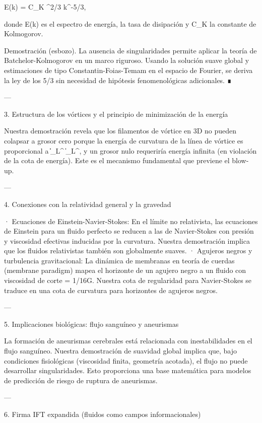 \documentclass[12pt,twoside]{book}
\begin{document}
E(k) = C_K \varepsilon^{2/3} k^{-5/3},

donde E(k) es el espectro de energía, \varepsilon la tasa de disipación y C_K la constante de Kolmogorov.

Demostración (esbozo). La ausencia de singularidades permite aplicar la teoría de Batchelor-Kolmogorov en un marco riguroso. Usando la solución suave global y estimaciones de tipo Constantin-Foias-Temam en el espacio de Fourier, se deriva la ley de los 5/3 sin necesidad de hipótesis fenomenológicas adicionales. ∎

---

3. Estructura de los vórtices y el principio de minimización de la energía

Nuestra demostración revela que los filamentos de vórtice en 3D no pueden colapsar a grosor cero porque la energía de curvatura de la línea de vórtice es proporcional a \|\boldsymbol{\omega}\|_{L^\infty} \log \|\boldsymbol{\omega}\|_{L^\infty}, y un grosor nulo requeriría energía infinita (en violación de la cota de energía). Este es el mecanismo fundamental que previene el blow-up.

---

4. Conexiones con la relatividad general y la gravedad

· Ecuaciones de Einstein-Navier-Stokes: En el límite no relativista, las ecuaciones de Einstein para un fluido perfecto se reducen a las de Navier-Stokes con presión y viscosidad efectivas inducidas por la curvatura. Nuestra demostración implica que los fluidos relativistas también son globalmente suaves.
· Agujeros negros y turbulencia gravitacional: La dinámica de membranas en teoría de cuerdas (membrane paradigm) mapea el horizonte de un agujero negro a un fluido con viscosidad de corte \eta = 1/16\pi G. Nuestra cota de regularidad para Navier-Stokes se traduce en una cota de curvatura para horizontes de agujeros negros.

---

5. Implicaciones biológicas: flujo sanguíneo y aneurismas

La formación de aneurismas cerebrales está relacionada con inestabilidades en el flujo sanguíneo. Nuestra demostración de suavidad global implica que, bajo condiciones fisiológicas (viscosidad finita, geometría acotada), el flujo no puede desarrollar singularidades. Esto proporciona una base matemática para modelos de predicción de riesgo de ruptura de aneurismas.

---

6. Firma IFT expandida (fluidos como campos informacionales)
\end{document}
